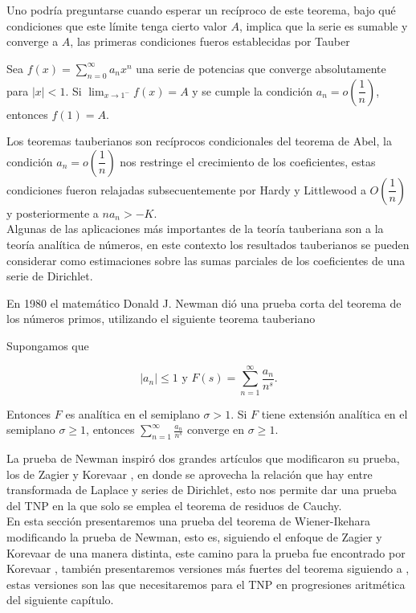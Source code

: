 Uno podría preguntarse cuando esperar un recíproco de este teorema, bajo qué condiciones que este límite tenga cierto valor $A$, implica que la serie es sumable y converge a $A$, las primeras condiciones fueros establecidas por Tauber

\begin{prop}[Tauber, 1897]
    Sea $f(x)=\displaystyle\sum_{n=0}^{\infty} a_n x^n$ una serie de potencias que converge absolutamente para $|x|<1$.
Si $\lim_{x \rightarrow 1^{-}} f(x)=A$ y se cumple la condición $a_n=o\left(\dfrac{1}{n}\right)$, entonces $f(1)=A$.
\end{prop}

Los teoremas tauberianos son recíprocos condicionales del teorema de Abel, la condición $a_n=o\left(\dfrac{1}{n}\right)$ nos restringe el crecimiento de los coeficientes, estas condiciones fueron relajadas subsecuentemente por Hardy y Littlewood a $O\left(\dfrac{1}{n}\right)$ y posteriormente a $na_n>-K$.\\

Algunas de las aplicaciones más importantes de la teoría tauberiana son a la teoría analítica de números, en este contexto los resultados tauberianos se pueden considerar como estimaciones sobre las sumas parciales de los coeficientes de una serie de Dirichlet.

En 1980 el matemático Donald J. Newman dió una prueba corta del teorema de los números primos, utilizando el siguiente teorema tauberiano

\begin{theorem}[Newman]
    Supongamos que 

    $$|a_n|\leq 1 \text{ y } F(s)=\sum_{n=1}^{\infty} \frac{a_n}{n^s}.$$

    Entonces $F$ es analítica en el semiplano $\sigma>1$. Si $F$ tiene extensión analítica en el semiplano $\sigma\geq 1$, entonces $\displaystyle\sum_{n=1}^{\infty} \frac{a_n}{n^s}$ converge en $\sigma\geq 1$.
\end{theorem}

La prueba de Newman inspiró dos grandes artículos que modificaron su prueba, los de Zagier \cite{zagier1997newman} y Korevaar \cite{korevaar1982newman}, en donde se aprovecha la relación que hay entre transformada de Laplace y series de Dirichlet, esto nos permite dar una prueba del TNP en la que solo se emplea el teorema de residuos de Cauchy.\\

En esta sección presentaremos una prueba del teorema de Wiener-Ikehara modificando la prueba de Newman, esto es, siguiendo el enfoque de Zagier y Korevaar de una manera distinta, este camino para la prueba fue encontrado por Korevaar \cite{korevaar2006wiener}, también presentaremos versiones más fuertes del teorema siguiendo a \cite{vatwani2015simple}, estas versiones son las que necesitaremos para el TNP en progresiones aritmética del siguiente capítulo.


